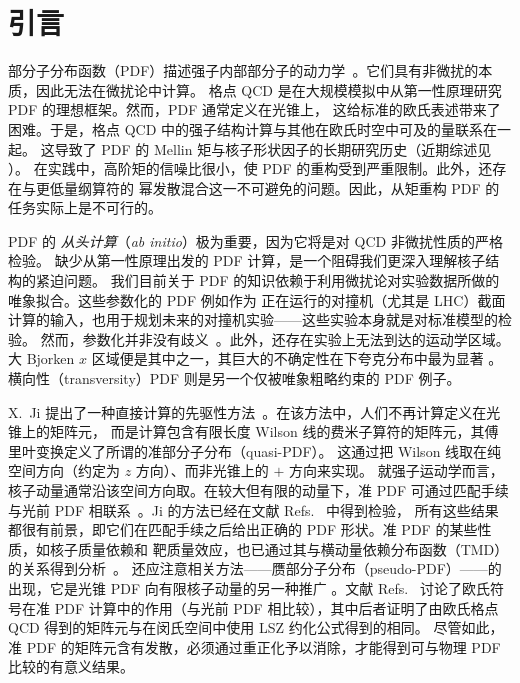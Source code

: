 \section{引言}
\label{sec:intro}

部分子分布函数（PDF）描述强子内部部分子的动力学~\cite{Feynman:102074}。它们具有非微扰的本质，因此无法在微扰论中计算。
格点 QCD 是在大规模模拟中从第一性原理研究 PDF 的理想框架。然而，PDF 通常定义在光锥上，
这给标准的欧氏表述带来了困难。于是，格点 QCD 中的强子结构计算与其他在欧氏时空中可及的量联系在一起。
这导致了 PDF 的 Mellin 矩与核子形状因子的长期研究历史（近期综述见
\cite{Constantinou:2014tga, Constantinou:2015agp,Alexandrou:2015yqa, Alexandrou:2015xts, Syritsyn:2014saa}）。
在实践中，高阶矩的信噪比很小，使 PDF 的重构受到严重限制。此外，还存在与更低量纲算符的
幂发散混合这一不可避免的问题。因此，从矩重构 PDF 的任务实际上是不可行的。

\medskip
PDF 的 {\textit{从头计算}}（{\textit{ab initio}}）极为重要，因为它将是对 QCD 非微扰性质的严格检验。
缺少从第一性原理出发的 PDF 计算，是一个阻碍我们更深入理解核子结构的紧迫问题。
我们目前关于 PDF 的知识依赖于利用微扰论对实验数据所做的唯象拟合。这些参数化的 PDF 例如作为
正在运行的对撞机（尤其是 LHC）截面计算的输入，也用于规划未来的对撞机实验——这些实验本身就是对标准模型的检验。
然而，参数化并非没有歧义~\cite{Jimenez-Delgado:2013sma}。此外，还存在实验上无法到达的运动学区域。
大 Bjorken $x$ 区域便是其中之一，其巨大的不确定性在下夸克分布中最为显著
\cite{Accardi:2016qay,Alekhin:2017kpj}。横向性（transversity）PDF 则是另一个仅被唯象粗略约束的 PDF 例子。

\medskip
X.~Ji 提出了一种直接计算的先驱性方法~\cite{Ji:2013dva}。在该方法中，人们不再计算定义在光锥上的矩阵元，
而是计算包含有限长度 Wilson 线的费米子算符的矩阵元，其傅里叶变换定义了所谓的准部分子分布（quasi-PDF）。
这通过把 Wilson 线取在纯空间方向（约定为 $z$ 方向）、而非光锥上的 $+$ 方向来实现。
就强子运动学而言，核子动量通常沿该空间方向取。在较大但有限的动量下，准 PDF 可通过匹配手续
与光前 PDF 相联系~\cite{Xiong:2013bka,Chen:2016fxx}。Ji 的方法已经在文献
Refs.~\cite{Lin:2014zya,Gamberg:2014zwa,Alexandrou:2015rja,Chen:2016utp,Alexandrou:2016jqi} 中得到检验，
所有这些结果都很有前景，即它们在匹配手续之后给出正确的 PDF 形状。准 PDF 的某些性质，如核子质量依赖和
靶质量效应，也已通过其与横动量依赖分布函数（TMD）的关系得到分析~\cite{Radyushkin:2017ffo,Radyushkin:2016hsy}。
还应注意相关方法——赝部分子分布（pseudo-PDF）——的出现，它是光锥 PDF 向有限核子动量的另一种推广
\cite{Radyushkin:2017cyf,Orginos:2017kos}。文献 Refs.~\cite{Carlson:2017gpk,Briceno:2017cpo} 讨论了欧氏符号在准 PDF
计算中的作用（与光前 PDF 相比较），其中后者证明了由欧氏格点 QCD 得到的矩阵元与在闵氏空间中使用 LSZ 约化公式得到的相同。
尽管如此，准 PDF 的矩阵元含有发散，必须通过重正化予以消除，才能得到可与物理 PDF 比较的有意义结果。

